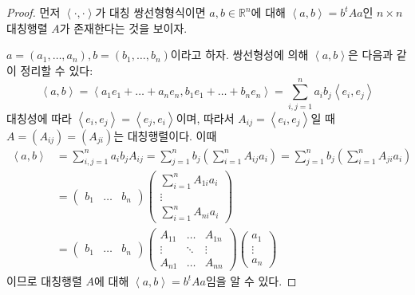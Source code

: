 \documentclass[unfonts,oneside,a4paper]{oblivoir}
\theoremstyle{definition}
\theoremstyle{theorem}
\theoremstyle{theorem}
\theoremstyle{remark}
\theoremstyle{remark}
\theoremstyle{remark}
\theoremstyle{remark}
\renewcommand{\vec}[1]{\bm{\mathit{#1}}}
\begin{document}
\begin{proof}
    먼저 $\left<\cdot, \cdot\right>$가 대칭 쌍선형형식이면 $\vec a, \vec b \in \mathbb R^n$에 대해 $\left<\vec a, \vec b\right> = \vec b^t A \vec a$인 $n \times n$ 대칭행렬 $A$가 존재한다는 것을 보이자.

    $\vec a = (a_1, \dots, a_n), \vec b = (b_1, \dots, b_n)$이라고 하자.
    쌍선형성에 의해 $\left<\vec a, \vec b\right>$은 다음과 같이 정리할 수 있다:
    \begin{equation*}
        \left<\vec a, \vec b\right> = \left<a_1 \vec e_1 + \dots + a_n \vec e_n, b_1 \vec e_1 + \dots + b_n \vec e_n\right> = \sum_{i, j = 1}^n a_i b_j \left<\vec e_i, \vec e_j\right>
    \end{equation*}
    대칭성에 따라 $\left<\vec e_i, \vec e_j\right> = \left<\vec e_j, \vec e_i\right>$이며, 따라서 $A_{ij} = \left<\vec e_i, \vec e_j\right>$일 때 $A = (A_{ij}) = (A_{ji})$는 대칭행렬이다.
    이때
    \begin{align*}
        \left<\vec a, \vec b \right> &= \sum_{i, j = 1}^n a_i b_j A_{ij} = \sum_{j = 1}^n b_j \left(\sum_{i = 1}^n A_{ij} a_i\right) = \sum_{j = 1}^n b_j \left(\sum_{i = 1}^n A_{ji} a_i\right)\\
                                     &=
                                     \begin{pmatrix}
                                         b_1 & \dots & b_n
                                     \end{pmatrix}
                                     \begin{pmatrix}
                                         \sum_{i = 1}^n A_{1i} a_i\\
                                         \vdots\\
                                         \sum_{i = 1}^n A_{ni} a_i
                                     \end{pmatrix}\\
                                     &=
                                     \begin{pmatrix}
                                         b_1 & \dots & b_n
                                     \end{pmatrix}
                                     \begin{pmatrix}
                                         A_{11} & \dots & A_{1n}\\
                                         \vdots & \ddots & \vdots\\
                                         A_{n1} & \dots & A_{nn}
                                     \end{pmatrix}
                                     \begin{pmatrix}
                                         a_1\\
                                         \vdots\\
                                         a_n
                                     \end{pmatrix}
    \end{align*}
    이므로 대칭행렬 $A$에 대해 $\left<\vec a, \vec b\right> = \vec b^t A \vec a$임을 알 수 있다.


\end{proof}
\end{document}

